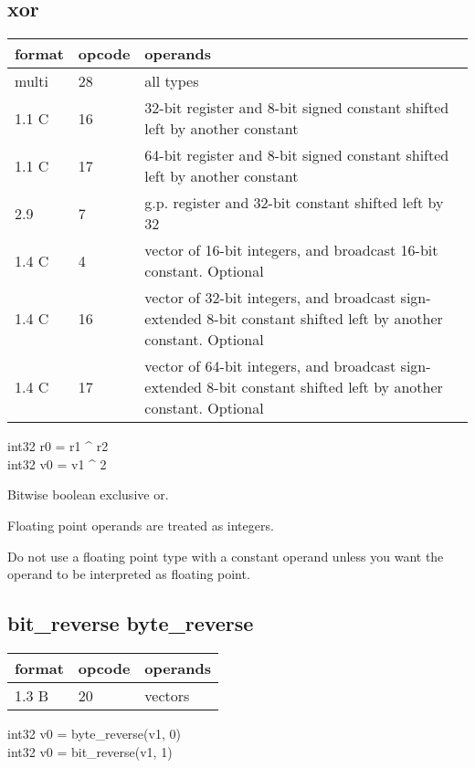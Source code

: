 \documentclass[forwardcom.tex]{subfiles}
\begin{document}
\subsection{xor}
\label{table:xorInstruction}
\begin{tabular}{|p{12mm}|p{12mm}|p{110mm}|}
\hline
\bfseries format & \bfseries opcode & \bfseries operands \\ \hline
multi & 28 & all types \\ \hline
1.1 C & 16 & 32-bit register and 8-bit signed constant shifted left by another constant \\ \hline
1.1 C & 17 & 64-bit register and 8-bit signed constant shifted left by another constant \\ \hline
2.9   &  7 & g.p. register and 32-bit constant shifted left by 32 \\ \hline
1.4 C &  4 & vector of 16-bit integers, and broadcast 16-bit constant. Optional \\ \hline
1.4 C & 16 & vector of 32-bit integers, and broadcast sign-extended 8-bit constant shifted left by another constant. Optional \\ \hline
1.4 C & 17 & vector of 64-bit integers, and broadcast sign-extended 8-bit constant shifted left by another constant. Optional \\ \hline
\end{tabular}
\vv

int32 r0 = r1 \^{} r2 \\
int32 v0 = v1 \^{} 2
\vv

Bitwise boolean exclusive or.
\vv

Floating point operands are treated as integers.

Do not use a floating point type with a constant operand unless you want the operand to be interpreted as floating point.
\vv

\subsection{bit\_reverse byte\_reverse}
\label{table:bitReverseInstruction}
\begin{tabular}{|p{12mm}|p{15mm}|p{100mm}|}
\hline
\bfseries format & \bfseries opcode & \bfseries operands \\ \hline
1.3 B & 20 & vectors \\ \hline
\end{tabular}
\vv

int32 v0 = byte\_reverse(v1, 0)\\
int32 v0 = bit\_reverse(v1, 1)
\vv
\end{document}
